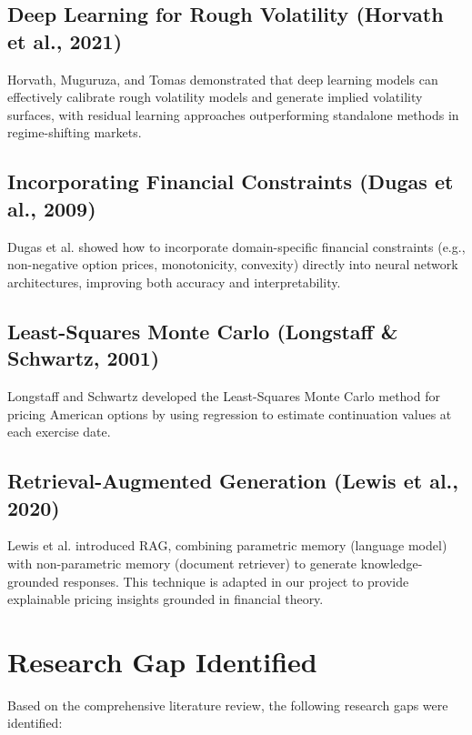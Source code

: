 \documentclass[12pt,a4paper]{report}
\begin{document}
\subsection{Deep Learning for Rough Volatility (Horvath et al., 2021)}

Horvath, Muguruza, and Tomas \cite{horvath2021} demonstrated that deep learning models can effectively calibrate rough volatility models and generate implied volatility surfaces, with residual learning approaches outperforming standalone methods in regime-shifting markets.

\subsection{Incorporating Financial Constraints (Dugas et al., 2009)}

Dugas et al. \cite{dugas2009} showed how to incorporate domain-specific financial constraints (e.g., non-negative option prices, monotonicity, convexity) directly into neural network architectures, improving both accuracy and interpretability.

\subsection{Least-Squares Monte Carlo (Longstaff \& Schwartz, 2001)}

Longstaff and Schwartz \cite{longstaff2001} developed the Least-Squares Monte Carlo method for pricing American options by using regression to estimate continuation values at each exercise date.

\subsection{Retrieval-Augmented Generation (Lewis et al., 2020)}

Lewis et al. \cite{lewis2020} introduced RAG, combining parametric memory (language model) with non-parametric memory (document retriever) to generate knowledge-grounded responses. This technique is adapted in our project to provide explainable pricing insights grounded in financial theory.

\section{Research Gap Identified}

Based on the comprehensive literature review, the following research gaps were identified:
\end{document}
